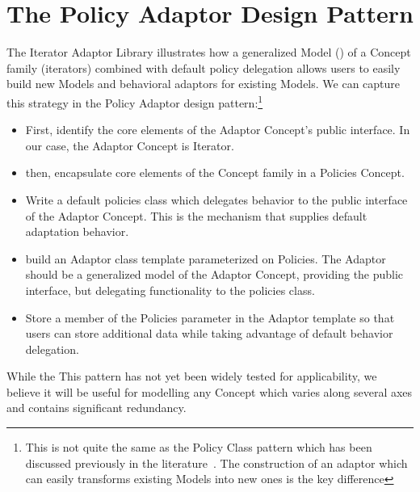 \documentclass{netobjectdays}
\newcommand{\iteratoradaptor}{\code{iterator\_\-adaptor}}
\begin{document}
\section{The Policy Adaptor Design Pattern}

The Iterator Adaptor Library illustrates how a generalized Model
(\iteratoradaptor{}) of a Concept family (iterators) combined with
default policy delegation allows users to easily build new Models and
behavioral adaptors for existing Models. We can capture this strategy
in the Policy Adaptor design pattern:\footnote{This is not quite the
same as the Policy Class pattern which has been discussed previously
in the literature~\cite{alexandrescu01:_modern_cpp_design}. The
construction of an adaptor which can easily transforms existing Models
into new ones is the key difference}\begin{itemize}

 \item First, identify the core elements of the Adaptor Concept's
 public interface. In our case, the Adaptor Concept is Iterator.

 \item then, encapsulate core elements of the Concept family in a
Policies Concept.

 \item Write a default policies class which delegates behavior to the
public interface of the Adaptor Concept. This is the mechanism that
supplies default adaptation behavior.

 \item build an Adaptor class template parameterized on Policies. The
Adaptor should be a generalized model of the Adaptor Concept,
providing the public interface, but delegating functionality to the
policies class.

 \item Store a member of the Policies parameter in the Adaptor
template so that users can store additional data while taking
advantage of default behavior delegation.

\end{itemize}

While the This pattern has not yet been widely tested for
applicability, we believe it will be useful for modelling any Concept
which varies along several axes and contains significant
redundancy. 

\end{document}
